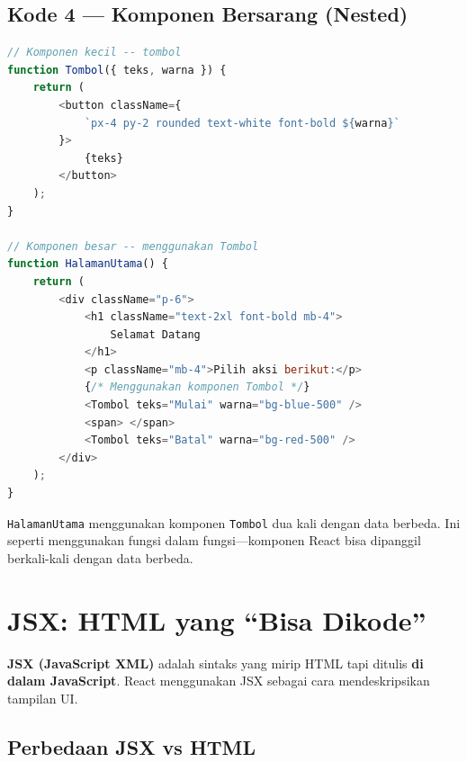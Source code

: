 \subsection{Kode 4 --- Komponen Bersarang (Nested)}

\begin{lstlisting}[language=JavaScript, caption={Komponen \texttt{Tombol} yang digunakan di dalam \texttt{HalamanUtama}}, label={lst:13-komponen-nested}]
// Komponen kecil -- tombol
function Tombol({ teks, warna }) {
    return (
        <button className={
            `px-4 py-2 rounded text-white font-bold ${warna}`
        }>
            {teks}
        </button>
    );
}

// Komponen besar -- menggunakan Tombol
function HalamanUtama() {
    return (
        <div className="p-6">
            <h1 className="text-2xl font-bold mb-4">
                Selamat Datang
            </h1>
            <p className="mb-4">Pilih aksi berikut:</p>
            {/* Menggunakan komponen Tombol */}
            <Tombol teks="Mulai" warna="bg-blue-500" />
            <span> </span>
            <Tombol teks="Batal" warna="bg-red-500" />
        </div>
    );
}
\end{lstlisting}

\begin{tip}
\texttt{HalamanUtama} menggunakan komponen \texttt{Tombol} dua kali dengan data berbeda. Ini seperti menggunakan fungsi dalam fungsi---komponen React bisa dipanggil berkali-kali dengan data berbeda.
\end{tip}

\section{JSX: HTML yang ``Bisa Dikode''}
\label{sec:13-jsx}

\textbf{JSX (JavaScript XML)} adalah sintaks yang mirip HTML tapi ditulis \textbf{di dalam JavaScript}. React menggunakan JSX sebagai cara mendeskripsikan tampilan UI.

\subsection{Perbedaan JSX vs HTML}

